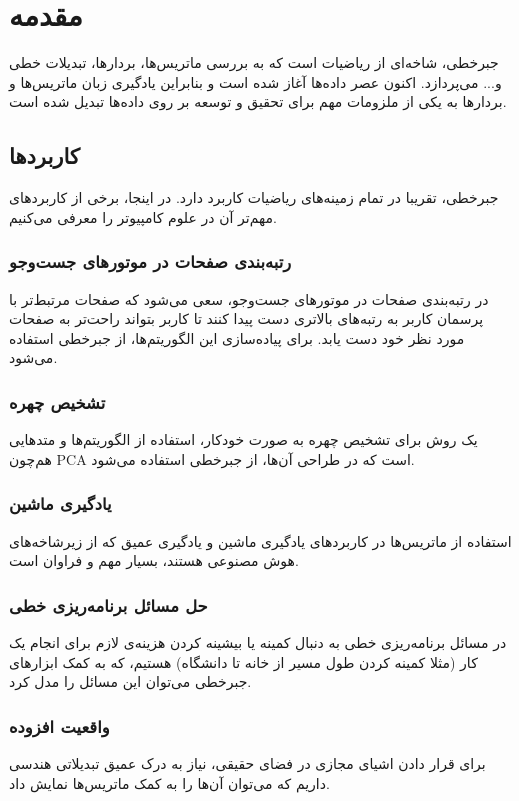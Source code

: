\chapter{مقدمه}

جبرخطی، شاخه‌ای از ریاضیات است که به بررسی ماتریس‌ها، بردارها، تبدیلات خطی و... می‌پردازد. اکنون عصر داده‌ها آغاز شده است و بنابراین یادگیری زبان ماتریس‌ها و بردارها به یکی از ملزومات مهم برای تحقیق و توسعه بر روی داده‌ها تبدیل شده است. 

\section{کاربردها}
جبرخطی، تقریبا در تمام زمینه‌های ریاضیات کاربرد دارد. در اینجا، برخی از کاربردهای مهم‌تر آن در علوم کامپیوتر را معرفی می‌کنیم.

\subsection{رتبه‌بندی صفحات در موتورهای جست‌وجو}
در رتبه‌بندی صفحات در موتورهای جست‌و‌جو، سعی می‌شود که صفحات مرتبط‌تر با پرسمان کاربر به رتبه‌های بالاتری دست پیدا کنند تا کاربر بتواند راحت‌تر به صفحات مورد نظر خود دست یابد. برای پیاده‌سازی این الگوریتم‌ها، از جبرخطی استفاده می‌شود.

\subsection{تشخیص چهره}
یک روش برای تشخیص چهره به صورت خودکار، استفاده از الگوریتم‌ها و متدهایی هم‌چون PCA است که در طراحی آن‌ها، از جبرخطی استفاده می‌شود.

\subsection{یادگیری ماشین}
استفاده از ماتریس‌ها در کاربردهای یادگیری ماشین و یادگیری عمیق که از زیرشاخه‌های هوش مصنوعی هستند، بسیار مهم و فراوان است.

\subsection{حل مسائل برنامه‌ریزی خطی}
در مسائل برنامه‌ریزی خطی به دنبال کمینه یا بیشینه کردن هزینه‌ی لازم برای انجام یک کار (مثلا کمینه کردن طول مسیر از خانه تا دانشگاه) هستیم، که به کمک ابزارهای جبرخطی می‌توان این مسائل را مدل کرد.

\subsection{واقعیت افزوده}
برای قرار دادن اشیای مجازی در فضای حقیقی، نیاز به درک عمیق تبدیلاتی هندسی داریم که می‌توان آن‌ها را به کمک ماتریس‌ها نمایش داد.

